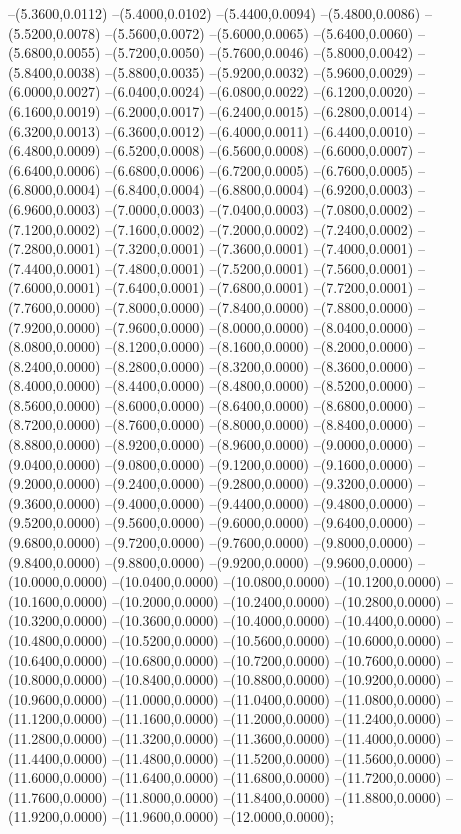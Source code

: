 {	--(5.3600,0.0112)
	--(5.4000,0.0102)
	--(5.4400,0.0094)
	--(5.4800,0.0086)
	--(5.5200,0.0078)
	--(5.5600,0.0072)
	--(5.6000,0.0065)
	--(5.6400,0.0060)
	--(5.6800,0.0055)
	--(5.7200,0.0050)
	--(5.7600,0.0046)
	--(5.8000,0.0042)
	--(5.8400,0.0038)
	--(5.8800,0.0035)
	--(5.9200,0.0032)
	--(5.9600,0.0029)
	--(6.0000,0.0027)
	--(6.0400,0.0024)
	--(6.0800,0.0022)
	--(6.1200,0.0020)
	--(6.1600,0.0019)
	--(6.2000,0.0017)
	--(6.2400,0.0015)
	--(6.2800,0.0014)
	--(6.3200,0.0013)
	--(6.3600,0.0012)
	--(6.4000,0.0011)
	--(6.4400,0.0010)
	--(6.4800,0.0009)
	--(6.5200,0.0008)
	--(6.5600,0.0008)
	--(6.6000,0.0007)
	--(6.6400,0.0006)
	--(6.6800,0.0006)
	--(6.7200,0.0005)
	--(6.7600,0.0005)
	--(6.8000,0.0004)
	--(6.8400,0.0004)
	--(6.8800,0.0004)
	--(6.9200,0.0003)
	--(6.9600,0.0003)
	--(7.0000,0.0003)
	--(7.0400,0.0003)
	--(7.0800,0.0002)
	--(7.1200,0.0002)
	--(7.1600,0.0002)
	--(7.2000,0.0002)
	--(7.2400,0.0002)
	--(7.2800,0.0001)
	--(7.3200,0.0001)
	--(7.3600,0.0001)
	--(7.4000,0.0001)
	--(7.4400,0.0001)
	--(7.4800,0.0001)
	--(7.5200,0.0001)
	--(7.5600,0.0001)
	--(7.6000,0.0001)
	--(7.6400,0.0001)
	--(7.6800,0.0001)
	--(7.7200,0.0001)
	--(7.7600,0.0000)
	--(7.8000,0.0000)
	--(7.8400,0.0000)
	--(7.8800,0.0000)
	--(7.9200,0.0000)
	--(7.9600,0.0000)
	--(8.0000,0.0000)
	--(8.0400,0.0000)
	--(8.0800,0.0000)
	--(8.1200,0.0000)
	--(8.1600,0.0000)
	--(8.2000,0.0000)
	--(8.2400,0.0000)
	--(8.2800,0.0000)
	--(8.3200,0.0000)
	--(8.3600,0.0000)
	--(8.4000,0.0000)
	--(8.4400,0.0000)
	--(8.4800,0.0000)
	--(8.5200,0.0000)
	--(8.5600,0.0000)
	--(8.6000,0.0000)
	--(8.6400,0.0000)
	--(8.6800,0.0000)
	--(8.7200,0.0000)
	--(8.7600,0.0000)
	--(8.8000,0.0000)
	--(8.8400,0.0000)
	--(8.8800,0.0000)
	--(8.9200,0.0000)
	--(8.9600,0.0000)
	--(9.0000,0.0000)
	--(9.0400,0.0000)
	--(9.0800,0.0000)
	--(9.1200,0.0000)
	--(9.1600,0.0000)
	--(9.2000,0.0000)
	--(9.2400,0.0000)
	--(9.2800,0.0000)
	--(9.3200,0.0000)
	--(9.3600,0.0000)
	--(9.4000,0.0000)
	--(9.4400,0.0000)
	--(9.4800,0.0000)
	--(9.5200,0.0000)
	--(9.5600,0.0000)
	--(9.6000,0.0000)
	--(9.6400,0.0000)
	--(9.6800,0.0000)
	--(9.7200,0.0000)
	--(9.7600,0.0000)
	--(9.8000,0.0000)
	--(9.8400,0.0000)
	--(9.8800,0.0000)
	--(9.9200,0.0000)
	--(9.9600,0.0000)
	--(10.0000,0.0000)
	--(10.0400,0.0000)
	--(10.0800,0.0000)
	--(10.1200,0.0000)
	--(10.1600,0.0000)
	--(10.2000,0.0000)
	--(10.2400,0.0000)
	--(10.2800,0.0000)
	--(10.3200,0.0000)
	--(10.3600,0.0000)
	--(10.4000,0.0000)
	--(10.4400,0.0000)
	--(10.4800,0.0000)
	--(10.5200,0.0000)
	--(10.5600,0.0000)
	--(10.6000,0.0000)
	--(10.6400,0.0000)
	--(10.6800,0.0000)
	--(10.7200,0.0000)
	--(10.7600,0.0000)
	--(10.8000,0.0000)
	--(10.8400,0.0000)
	--(10.8800,0.0000)
	--(10.9200,0.0000)
	--(10.9600,0.0000)
	--(11.0000,0.0000)
	--(11.0400,0.0000)
	--(11.0800,0.0000)
	--(11.1200,0.0000)
	--(11.1600,0.0000)
	--(11.2000,0.0000)
	--(11.2400,0.0000)
	--(11.2800,0.0000)
	--(11.3200,0.0000)
	--(11.3600,0.0000)
	--(11.4000,0.0000)
	--(11.4400,0.0000)
	--(11.4800,0.0000)
	--(11.5200,0.0000)
	--(11.5600,0.0000)
	--(11.6000,0.0000)
	--(11.6400,0.0000)
	--(11.6800,0.0000)
	--(11.7200,0.0000)
	--(11.7600,0.0000)
	--(11.8000,0.0000)
	--(11.8400,0.0000)
	--(11.8800,0.0000)
	--(11.9200,0.0000)
	--(11.9600,0.0000)
	--(12.0000,0.0000);
}
